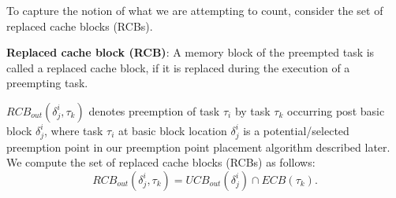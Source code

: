 To capture the notion of what we are attempting to count, consider the set of replaced cache blocks (RCBs).

\begin{definition}
\textbf{Replaced cache block (RCB)}: A memory block of the preempted task is called a replaced cache block, if it is replaced during the execution of a preempting task.
\end{definition}

\noindent \begin{math}\textit{RCB}_{out}(\delta_{j}^{i},\tau_{k})\end{math} denotes preemption of task \begin{math}\tau_{i}\end{math} by task \begin{math}\tau_{k}\end{math} occurring post basic block \begin{math}\delta_{j}^{i}\end{math}, where task \begin{math}\tau_{i}\end{math} at basic block location \begin{math}\delta_{j}^{i}\end{math} is a potential/selected preemption point in our preemption point placement algorithm described later.  We compute the set of replaced cache blocks (RCBs) as follows:
\begin{equation}\label{eqn:rcb-formula}
    \textit{RCB}_{out}(\delta_{j}^{i},\tau_{k}) = \textit{UCB}_{out}(\delta_{j}^{i}) \cap \textit{ECB}(\tau_{k}).
\end{equation}


